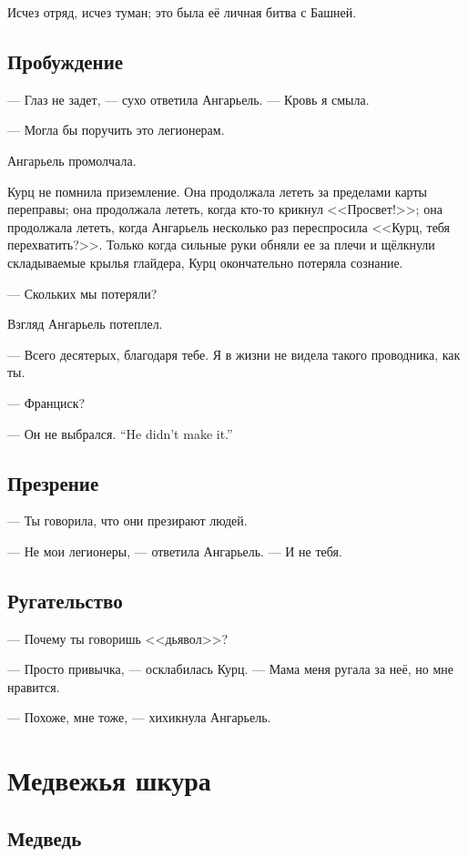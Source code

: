 Исчез отряд, исчез туман;
это была её личная битва с Башней.

\section{Пробуждение}

--- Глаз не задет, --- сухо ответила Ангарьель.
--- Кровь я смыла.

--- Могла бы поручить это легионерам.

Ангарьель промолчала.

Курц не помнила приземление.
Она продолжала лететь за пределами карты переправы;
она продолжала лететь, когда кто-то крикнул <<Просвет!>>;
она продолжала лететь, когда Ангарьель несколько раз переспросила <<Курц, тебя перехватить?>>.
Только когда сильные руки обняли ее за плечи и щёлкнули складываемые крылья глайдера, Курц окончательно потеряла сознание.

--- Скольких мы потеряли?

Взгляд Ангарьель потеплел.

--- Всего десятерых, благодаря тебе.
Я в жизни не видела такого проводника, как ты.

--- Франциск?

{--- Он не выбрался.}
{``He didn't make it.''}

\section{Презрение}

--- Ты говорила, что они презирают людей.

--- Не мои легионеры, --- ответила Ангарьель.
--- И не тебя.

\section{Ругательство}

--- Почему ты говоришь <<дьявол>>?

--- Просто привычка, --- осклабилась Курц.
--- Мама меня ругала за неё, но мне нравится.

--- Похоже, мне тоже, --- хихикнула Ангарьель.

\chapter{Медвежья шкура}

\section{Медведь}

